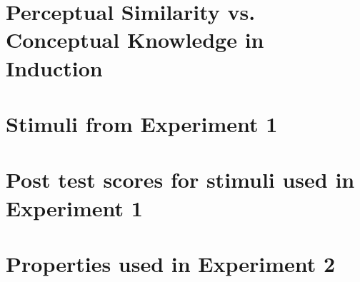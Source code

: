 \documentclass{../Dissertate}
\begin{document}
\doublespacing

\setcounter{chapter}{2} %
\chapter{Perceptual Similarity vs. Conceptual Knowledge in Induction}










\begin{appendices}
  \appendixpage
  \graphicspath{{./../Appendices/}}
  
  \chapter{Stimuli from Experiment 1}\label{appendix:exp1_stimuli}
  

  \chapter{Post test scores for stimuli used in Experiment 1} \label{appendix:exp1_posttest}
  

  \chapter{Properties used in Experiment 2}\label{appendix:exp2_properties}
  
\end{appendices}



\end{document}
